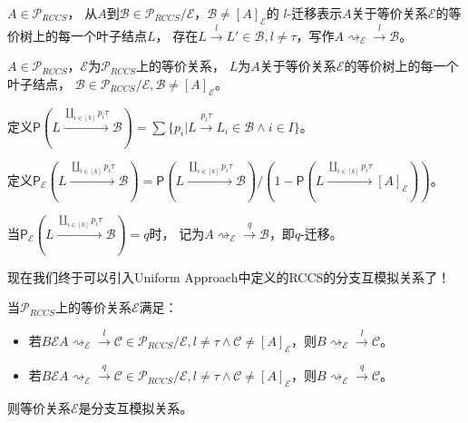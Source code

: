    \begin{definition}[$l$-迁移($l$-transition)]
      $A\in \mathcal{P}_{RCCS}$，
      从$A$到$\mathcal{B}\in \mathcal{P}_{RCCS}/\mathcal{E}，\mathcal{B}\neq [A]_{\mathcal{E}}$的
      $l$-迁移表示$A$关于等价关系$\mathcal{E}$的等价树上的每一个叶子结点$L$，
      存在$L\stackrel{l}{\rightarrow}L'\in\mathcal{B},l\neq \tau$，写作$A\rightsquigarrow_{\mathcal{E}}\stackrel{l}{\rightarrow}\mathcal{B}$。
   \end{definition}

   \begin{definition}[$q$-迁移($q$-transition)]
      $A\in \mathcal{P}_{RCCS}$，$\mathcal{E}$为$\mathcal{P}_{RCCS}$上的等价关系，
      $L$为$A$关于等价关系$\mathcal{E}$的等价树上的每一个叶子结点，
      $\mathcal{B}\in \mathcal{P}_{RCCS}/\mathcal{E}, \mathcal{B}\neq [A]_{\mathcal{E}}$。

      定义$\mathsf{P}(L\stackrel{\coprod_{i\in[k]}p_i\tau}{\longrightarrow}\mathcal{B})=\sum \{p_i|L\stackrel{p_i\tau}{\longrightarrow}L_i\in \mathcal{B}\wedge i\in I\}$。
      
      定义$\mathsf{P}_{\mathcal{E}}(L\stackrel{\coprod_{i\in[k]}p_i\tau}{\longrightarrow}\mathcal{B})=\mathsf{P}(L\stackrel{\coprod_{i\in[k]}p_i\tau}{\longrightarrow}\mathcal{B})/(1-\mathsf{P}(L\stackrel{\coprod_{i\in[k]}p_i\tau}{\longrightarrow}[A]_{\mathcal{E}}))$。

      当$\mathsf{P}_{\mathcal{E}}(L\stackrel{\coprod_{i\in[k]}p_i\tau}{\longrightarrow}\mathcal{B})=q$时，
      记为$A\rightsquigarrow_{\mathcal{E}}\stackrel{q}{\rightarrow}\mathcal{B}$，即$q$-迁移。
   \end{definition}

   现在我们终于可以引入Uniform Approach中定义的RCCS的分支互模拟关系了！

   \begin{definition}
      当$\mathcal{P}_{RCCS}$上的等价关系$\mathcal{E}$满足：
      \begin{itemize}
         \item {
            若$B\mathcal{E}A\rightsquigarrow_{\mathcal{E}}\stackrel{l}{\rightarrow}\mathcal{C}\in \mathcal{P}_{RCCS}/\mathcal{E}, l\neq \tau \wedge \mathcal{C}\neq [A]_{\mathcal{E}}$，则$B\rightsquigarrow_{\mathcal{E}}\stackrel{l}{\rightarrow}\mathcal{C}$。
         }
         \item {
            若$B\mathcal{E}A\rightsquigarrow_{\mathcal{E}}\stackrel{q}{\rightarrow}\mathcal{C}\in \mathcal{P}_{RCCS}/\mathcal{E}, l\neq \tau \wedge \mathcal{C}\neq [A]_{\mathcal{E}}$，则$B\rightsquigarrow_{\mathcal{E}}\stackrel{q}{\rightarrow}\mathcal{C}$。
         }
      \end{itemize}
      则等价关系$\mathcal{E}$是分支互模拟关系。
   \end{definition}

